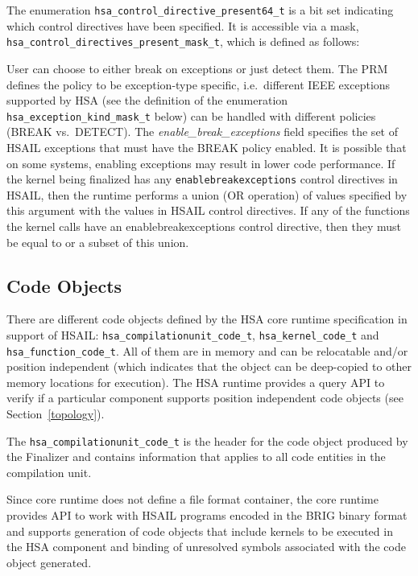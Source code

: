 The enumeration \texttt{hsa\_control\_directive\_present64\_t} is a
bit set indicating which control directives have been specified. It
is accessible via a mask, 
\texttt{hsa\_control\_directives\_present\_mask\_t}, which
is defined as follows:



User can choose to either break on exceptions or just detect them.
The PRM defines the policy to be exception-type specific, i.e.\ different
IEEE exceptions supported by HSA (see the definition of the
enumeration \texttt{hsa\_exception\_kind\_mask\_t} below)  can be
handled with different policies (BREAK vs.\ DETECT). 
The {\itshape enable\_break\_exceptions} field specifies the set of
HSAIL exceptions that must have the BREAK policy enabled. It is
possible that on some systems, enabling exceptions may result in
lower code performance.
If the kernel being finalized has any \texttt{enablebreakexceptions}
control directives in HSAIL, then the runtime performs a union (OR
operation) of values specified by this argument with the values in
HSAIL control directives. If any of the functions the kernel calls
have an enablebreakexceptions control directive, then they must be
equal to or a subset of this union.



\subsection{Code Objects}\label{finalize:codeobject}

There are different code objects defined by the HSA core runtime
specification in support of HSAIL: 
\texttt{hsa\_compilationunit\_code\_t},
\texttt{hsa\_kernel\_code\_t} and \texttt{hsa\_function\_code\_t}.
All of them are in memory and can be relocatable and/or position
independent (which indicates that the object can be deep-copied to
other memory locations for execution). The HSA runtime provides a
query API to verify if a particular component supports position
independent code objects (see Section~\ref{topology}). 

The \texttt{hsa\_compilationunit\_code\_t} is the header for the
code object produced by the Finalizer and contains information that
applies to all code entities in the compilation unit.

Since core runtime does not define a file format container, the core
runtime provides API to work with HSAIL programs encoded in the BRIG
binary format and supports generation of code objects that
include kernels to be executed in the HSA component and binding
of unresolved symbols associated with the code object
generated.  

